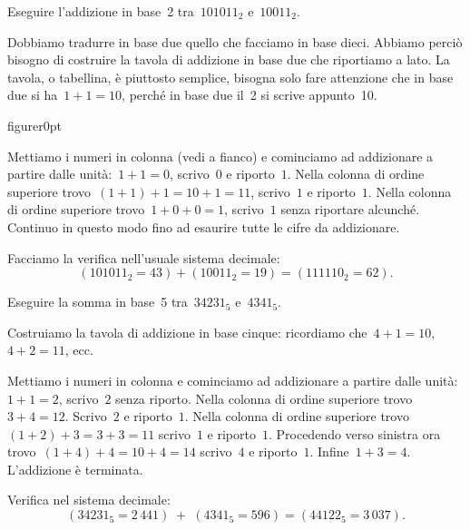 \begin{exrig}
\begin{esempio}
Eseguire l'addizione in base~2 tra~$101011_{2}$ e~$10011_{2}$.
\end{esempio}

Dobbiamo tradurre in base due quello che facciamo in base dieci. Abbiamo
perciò bisogno di costruire la tavola di addizione in base due che
riportiamo a lato. La tavola, o tabellina, è piuttosto semplice,
bisogna solo fare attenzione che in base due si ha~$1+1=10$, perché in base due il~2 si scrive appunto~10.

\begin{wrapfloat}{figure}{r}{0pt}

\end{wrapfloat}

Mettiamo i numeri in colonna (vedi a fianco) e cominciamo ad addizionare
a partire dalle unità:~$1+1=0$, scrivo~$0$ e riporto~$1$.
Nella colonna di ordine superiore trovo~$(1+1)+1=10+1=11$, scrivo~$1$ e
riporto~$1$.
Nella colonna di ordine superiore trovo~$1+0+0=1$, scrivo~$1$ senza
riportare alcunché. Continuo in questo modo fino ad esaurire tutte le cifre da addizionare.

Facciamo la verifica nell'usuale sistema decimale:
\[(101011_{2}=43)+(10011_{2}=19)=(111110_{2}=62).\]

\begin{esempio}
Eseguire la somma in base~5 tra~$34231_{5}$ e~$4341_{5}$.

Costruiamo la tavola di addizione in base cinque: ricordiamo che~$4+1=10$, $4+2=11$, ecc.

Mettiamo i numeri in colonna e cominciamo ad addizionare a partire dalle
unità:~$1+1=2$, scrivo~$2$ senza riporto. Nella colonna di ordine superiore
trovo~$3+4=12$. Scrivo~$2$ e riporto~$1$. Nella colonna di ordine superiore trovo~$(1+2)+3=3+3=11$ scrivo~$1$ e
riporto~$1$. Procedendo verso sinistra ora trovo~$(1+4)+4=10+4=14$ scrivo~$4$ e
riporto~$1$. Infine~$1+3=4$. L'addizione è terminata.
\begin{center}
 
\end{center}
Verifica nel sistema decimale:
\[(34231_{5}=2\,441)\;+\;(4341_{5}=596)=(44122_{5}=3\,037).\]
\end{esempio}

\end{exrig}

\ovalbox{\risolvii \ref{ese:4.21}, \ref{ese:4.22}, \ref{ese:4.23}}

